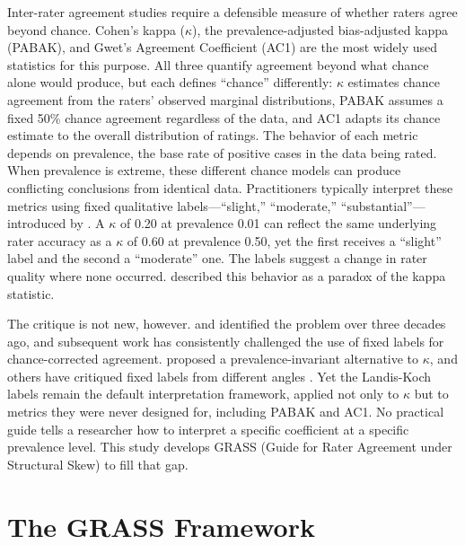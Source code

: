 \documentclass[11pt]{article}
\begin{document}
Inter-rater agreement studies require a defensible measure of whether raters agree beyond chance. Cohen's kappa ($\kappa$), the prevalence-adjusted bias-adjusted kappa (PABAK), and Gwet's Agreement Coefficient (AC1) are the most widely used statistics for this purpose. All three quantify agreement beyond what chance alone would produce, but each defines ``chance'' differently: $\kappa$ estimates chance agreement from the raters' observed marginal distributions, PABAK assumes a fixed 50\% chance agreement regardless of the data, and AC1 adapts its chance estimate to the overall distribution of ratings. The behavior of each metric depends on prevalence, the base rate of positive cases in the data being rated. When prevalence is extreme, these different chance models can produce conflicting conclusions from identical data. Practitioners typically interpret these metrics using fixed qualitative labels---``slight,'' ``moderate,'' ``substantial''---introduced by \citet{landis1977measurement}. A $\kappa$ of 0.20 at prevalence 0.01 can reflect the same underlying rater accuracy as a $\kappa$ of 0.60 at prevalence 0.50, yet the first receives a ``slight'' label and the second a ``moderate'' one. The labels suggest a change in rater quality where none occurred. \citet{feinstein1990high} described this behavior as a paradox of the kappa statistic.

The critique is not new, however. \citet{feinstein1990high} and \citet{cicchetti1990high} identified the problem over three decades ago, and subsequent work has consistently challenged the use of fixed labels for chance-corrected agreement. \citet{hoehler2000bias} proposed a prevalence-invariant alternative to $\kappa$, and others have critiqued fixed labels from different angles \citep{gwet2002kappa, sim2005kappa, vanacore2022robustness, quarfoot2016robust}. Yet the Landis-Koch labels remain the default interpretation framework, applied not only to $\kappa$ but to metrics they were never designed for, including PABAK and AC1. No practical guide tells a researcher how to interpret a specific coefficient at a specific prevalence level. This study develops GRASS (Guide for Rater Agreement under Structural Skew) to fill that gap.

\section*{The GRASS Framework}
\end{document}
